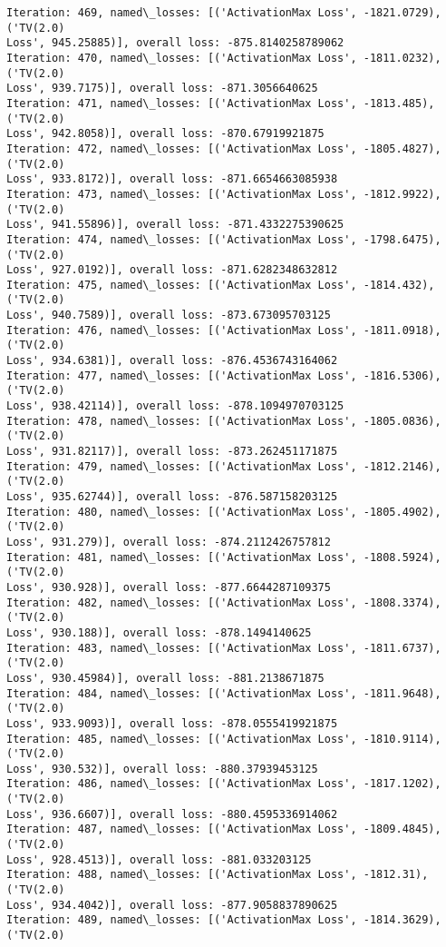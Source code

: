 \documentclass[10pt]{article}
\begin{document}
\begin{Verbatim}[commandchars=\\\{\}]
Iteration: 469, named\_losses: [('ActivationMax Loss', -1821.0729), ('TV(2.0)
Loss', 945.25885)], overall loss: -875.8140258789062
Iteration: 470, named\_losses: [('ActivationMax Loss', -1811.0232), ('TV(2.0)
Loss', 939.7175)], overall loss: -871.3056640625
Iteration: 471, named\_losses: [('ActivationMax Loss', -1813.485), ('TV(2.0)
Loss', 942.8058)], overall loss: -870.67919921875
Iteration: 472, named\_losses: [('ActivationMax Loss', -1805.4827), ('TV(2.0)
Loss', 933.8172)], overall loss: -871.6654663085938
Iteration: 473, named\_losses: [('ActivationMax Loss', -1812.9922), ('TV(2.0)
Loss', 941.55896)], overall loss: -871.4332275390625
Iteration: 474, named\_losses: [('ActivationMax Loss', -1798.6475), ('TV(2.0)
Loss', 927.0192)], overall loss: -871.6282348632812
Iteration: 475, named\_losses: [('ActivationMax Loss', -1814.432), ('TV(2.0)
Loss', 940.7589)], overall loss: -873.673095703125
Iteration: 476, named\_losses: [('ActivationMax Loss', -1811.0918), ('TV(2.0)
Loss', 934.6381)], overall loss: -876.4536743164062
Iteration: 477, named\_losses: [('ActivationMax Loss', -1816.5306), ('TV(2.0)
Loss', 938.42114)], overall loss: -878.1094970703125
Iteration: 478, named\_losses: [('ActivationMax Loss', -1805.0836), ('TV(2.0)
Loss', 931.82117)], overall loss: -873.262451171875
Iteration: 479, named\_losses: [('ActivationMax Loss', -1812.2146), ('TV(2.0)
Loss', 935.62744)], overall loss: -876.587158203125
Iteration: 480, named\_losses: [('ActivationMax Loss', -1805.4902), ('TV(2.0)
Loss', 931.279)], overall loss: -874.2112426757812
Iteration: 481, named\_losses: [('ActivationMax Loss', -1808.5924), ('TV(2.0)
Loss', 930.928)], overall loss: -877.6644287109375
Iteration: 482, named\_losses: [('ActivationMax Loss', -1808.3374), ('TV(2.0)
Loss', 930.188)], overall loss: -878.1494140625
Iteration: 483, named\_losses: [('ActivationMax Loss', -1811.6737), ('TV(2.0)
Loss', 930.45984)], overall loss: -881.2138671875
Iteration: 484, named\_losses: [('ActivationMax Loss', -1811.9648), ('TV(2.0)
Loss', 933.9093)], overall loss: -878.0555419921875
Iteration: 485, named\_losses: [('ActivationMax Loss', -1810.9114), ('TV(2.0)
Loss', 930.532)], overall loss: -880.37939453125
Iteration: 486, named\_losses: [('ActivationMax Loss', -1817.1202), ('TV(2.0)
Loss', 936.6607)], overall loss: -880.4595336914062
Iteration: 487, named\_losses: [('ActivationMax Loss', -1809.4845), ('TV(2.0)
Loss', 928.4513)], overall loss: -881.033203125
Iteration: 488, named\_losses: [('ActivationMax Loss', -1812.31), ('TV(2.0)
Loss', 934.4042)], overall loss: -877.9058837890625
Iteration: 489, named\_losses: [('ActivationMax Loss', -1814.3629), ('TV(2.0)

\end{Verbatim}
\end{document}
